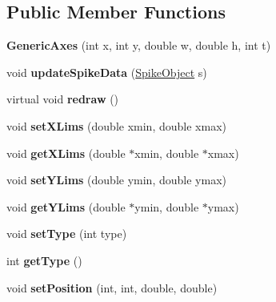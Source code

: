 \subsection*{Public Member Functions}
\begin{DoxyCompactItemize}
\item 
\hypertarget{classGenericAxes_a815be990a5475cb83b0c576beb79b4b8}{{\bfseries Generic\-Axes} (int x, int y, double w, double h, int t)}\label{classGenericAxes_a815be990a5475cb83b0c576beb79b4b8}

\item 
\hypertarget{classGenericAxes_ae44757d835ffd6de1c4fa05d57b77220}{void {\bfseries update\-Spike\-Data} (\hyperlink{structSpikeObject}{Spike\-Object} s)}\label{classGenericAxes_ae44757d835ffd6de1c4fa05d57b77220}

\item 
\hypertarget{classGenericAxes_ada612f54fc4e1354e2c356b0b0b713ab}{virtual void {\bfseries redraw} ()}\label{classGenericAxes_ada612f54fc4e1354e2c356b0b0b713ab}

\item 
\hypertarget{classGenericAxes_a4a2a5bb51f6c77d63fa8a6dec43b59c3}{void {\bfseries set\-X\-Lims} (double xmin, double xmax)}\label{classGenericAxes_a4a2a5bb51f6c77d63fa8a6dec43b59c3}

\item 
\hypertarget{classGenericAxes_a42f93ea776da8f543a5afaa932ee5f79}{void {\bfseries get\-X\-Lims} (double $\ast$xmin, double $\ast$xmax)}\label{classGenericAxes_a42f93ea776da8f543a5afaa932ee5f79}

\item 
\hypertarget{classGenericAxes_a5e9a75eaa20902a27b493e09cd567bcf}{void {\bfseries set\-Y\-Lims} (double ymin, double ymax)}\label{classGenericAxes_a5e9a75eaa20902a27b493e09cd567bcf}

\item 
\hypertarget{classGenericAxes_a6b81438346cb943333ad3113b1c07db2}{void {\bfseries get\-Y\-Lims} (double $\ast$ymin, double $\ast$ymax)}\label{classGenericAxes_a6b81438346cb943333ad3113b1c07db2}

\item 
\hypertarget{classGenericAxes_a7efbbf40fea1e85867a63af8cbdc2caf}{void {\bfseries set\-Type} (int type)}\label{classGenericAxes_a7efbbf40fea1e85867a63af8cbdc2caf}

\item 
\hypertarget{classGenericAxes_afd15d28941f474a93e625832b560bec7}{int {\bfseries get\-Type} ()}\label{classGenericAxes_afd15d28941f474a93e625832b560bec7}

\item 
\hypertarget{classGenericAxes_a41bf0d084d8bb593369fd3fef2067cf7}{void {\bfseries set\-Position} (int, int, double, double)}\label{classGenericAxes_a41bf0d084d8bb593369fd3fef2067cf7}

\end{DoxyCompactItemize}
